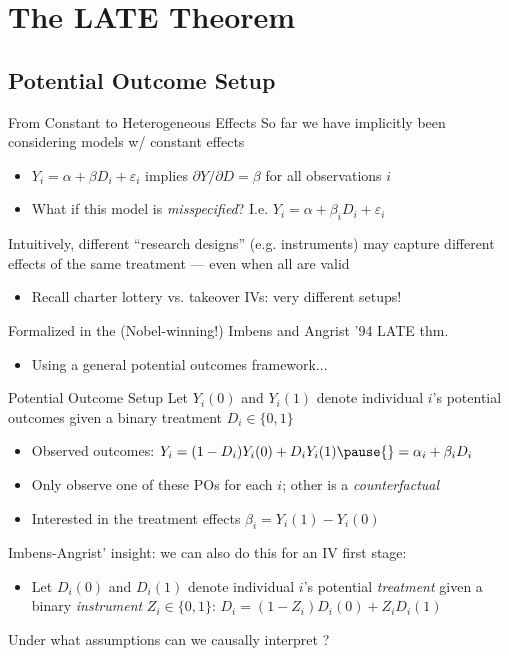 \documentclass{beamer}
\begin{document}

\section{The LATE Theorem}

\subsection{Potential Outcome Setup}
\begin{frame}{From Constant to Heterogeneous Effects}
So far we have implicitly been considering models w/ constant effects
\begin{itemize}
\item $Y_i=\alpha+\beta D_i+\varepsilon_i$ implies $\partial Y/\partial D = \beta$ for all observations $i$\smallskip
\item What if this model is \emph{misspecified}? I.e. $Y_i=\alpha+\beta_i D_i+\varepsilon_i$
\end{itemize}\medskip\pause{}
Intuitively, different ``research designs'' (e.g. instruments) may capture different effects of the same treatment --- even when all are valid\smallskip
\begin{itemize}
\item Recall charter lottery vs. takeover IVs: very different setups!
\end{itemize}\medskip\pause{}
Formalized in the (Nobel-winning!) Imbens and Angrist '94 LATE thm.\smallskip
\begin{itemize}
\item Using a general potential outcomes framework...
\end{itemize}
\end{frame}

\begin{frame}{Potential Outcome Setup}
Let $Y_i(0)$ and $Y_i(1)$ denote individual $i$'s potential outcomes given a binary treatment $D_i\in\{0,1\}$\smallskip
\begin{itemize}
\item Observed outcomes: $Y_i=(1-D_i)Y_i(0)+D_iY_i(1)\pause{}=\alpha_i+\beta_i D_i$\smallskip\pause{}
\item Only observe one of these POs for each $i$; other is a \emph{counterfactual}\smallskip
\item Interested in the treatment effects $\beta_i=Y_i(1)-Y_i(0)$
\end{itemize}\medskip\pause{}
Imbens-Angrist' insight: we can also do this for an IV first stage:\smallskip
\begin{itemize}
\item Let $D_i(0)$ and $D_i(1)$ denote individual $i$'s potential \emph{treatment} given a binary \emph{instrument} $Z_i\in\{0,1\}$:\pause{} $D_i=(1-Z_i)D_i(0)+Z_i D_i(1)$\smallskip
\end{itemize}\medskip\pause{}
Under what assumptions can we causally interpret ?
\end{frame}
\end{document}
